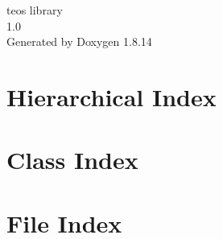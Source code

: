 \documentclass[twoside]{book}
\newcommand{\+}{\discretionary{\mbox{\scriptsize$\hookleftarrow$}}{}{}}
\newcommand{\clearemptydoublepage}{%
  \newpage{\pagestyle{empty}\cleardoublepage}%
}
\begin{document}
\hypersetup{pageanchor=false,
             bookmarksnumbered=true,
             pdfencoding=unicode
            }
\begin{titlepage}
\vspace*{7cm}
\begin{center}%
{\Large teos library \\[1ex]\large 1.\+0 }\\
\vspace*{1cm}
{\large Generated by Doxygen 1.8.14}\\
\end{center}
\end{titlepage}
\clearemptydoublepage
{}
\tableofcontents
\clearemptydoublepage
{}
\hypersetup{pageanchor=true}

\chapter{Hierarchical Index}

\chapter{Class Index}

\chapter{File Index}

\end{document}
